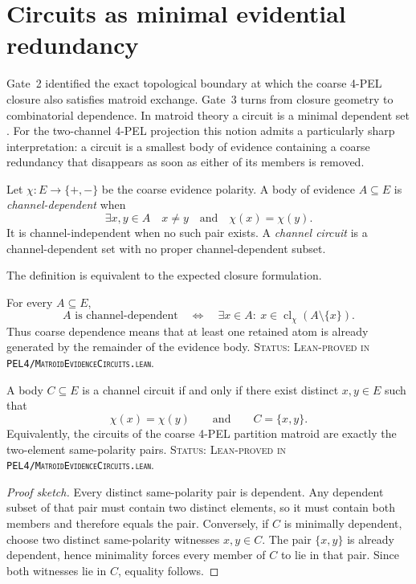 \section{Circuits as minimal evidential redundancy}
\label{sec:matroid-circuits}

Gate~2 identified the exact topological boundary at which the coarse 4-PEL
closure also satisfies matroid exchange. Gate~3 turns from closure geometry to
combinatorial dependence. In matroid theory a circuit is a minimal dependent
set \cite{Whitney1935,Oxley2011}. For the two-channel 4-PEL projection this
notion admits a particularly sharp interpretation: a circuit is a smallest body
of evidence containing a coarse redundancy that disappears as soon as either of
its members is removed.

\begin{definition}
Let \(\chi:E\to\{+,-\}\) be the coarse evidence polarity. A body of evidence
\(A\subseteq E\) is \emph{channel-dependent} when
\[
  \exists x,y\in A\quad x\neq y
  \quad\text{and}\quad
  \chi(x)=\chi(y).
\]
It is channel-independent when no such pair exists. A \emph{channel circuit}
is a channel-dependent set with no proper channel-dependent subset.
\end{definition}

The definition is equivalent to the expected closure formulation.

\begin{proposition}
For every \(A\subseteq E\),
\[
  A\text{ is channel-dependent}
  \quad\Longleftrightarrow\quad
  \exists x\in A:\
  x\in\operatorname{cl}_{\chi}(A\setminus\{x\}).
\]
Thus coarse dependence means that at least one retained atom is already generated
by the remainder of the evidence body.
\textup{\textsc{Status: Lean-proved in
\texttt{PEL4/MatroidEvidenceCircuits.lean}.}}
\end{proposition}

\begin{theorem}
A body \(C\subseteq E\) is a channel circuit if and only if there exist distinct
\(x,y\in E\) such that
\[
  \chi(x)=\chi(y)
  \qquad\text{and}\qquad
  C=\{x,y\}.
\]
Equivalently, the circuits of the coarse 4-PEL partition matroid are exactly the
two-element same-polarity pairs.
\textup{\textsc{Status: Lean-proved in
\texttt{PEL4/MatroidEvidenceCircuits.lean}.}}
\end{theorem}
\begin{proof}[Proof sketch]
Every distinct same-polarity pair is dependent. Any dependent subset of that
pair must contain two distinct elements, so it must contain both members and
therefore equals the pair. Conversely, if \(C\) is minimally dependent, choose
two distinct same-polarity witnesses \(x,y\in C\). The pair \(\{x,y\}\) is
already dependent, hence minimality forces every member of \(C\) to lie in that
pair. Since both witnesses lie in \(C\), equality follows.
\end{proof}


